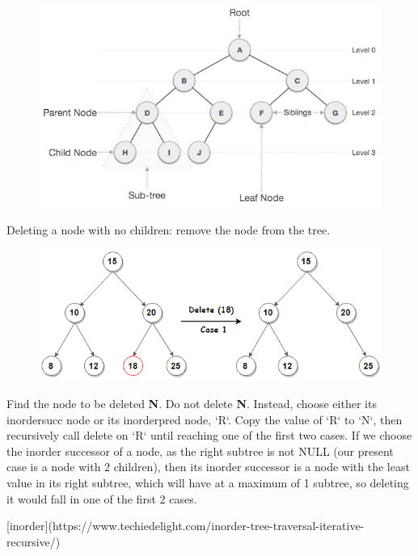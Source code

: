 \newpage
{}


\begin{figure}[h]
 \centering
\includegraphics[scale=.6]{images/binary_tree.jpg}
\end{figure}



Deleting a node with no children: remove the node from the tree.

\begin{figure}[h]
 \centering
\includegraphics[scale=.6]{images/Deletion-in-BST-Case-1.png}
\end{figure}


Find the node to be deleted \textbf{N}. Do not delete \textbf{N}. Instead, choose either its  \lowercase{\gls{inordersucc}} node or its \gls{inorderpred} node, `R`. Copy the value of `R` to `N`, then recursively call delete on `R` until reaching one of the first two cases. If we choose the inorder successor of a node, as the right subtree is not NULL (our present case is a node with 2 children), then its inorder successor is a node with the least value in its right subtree, which will have at a maximum of 1 subtree, so deleting it would fall in one of the first 2 cases.


[inorder](https://www.techiedelight.com/inorder-tree-traversal-iterative-recursive/)